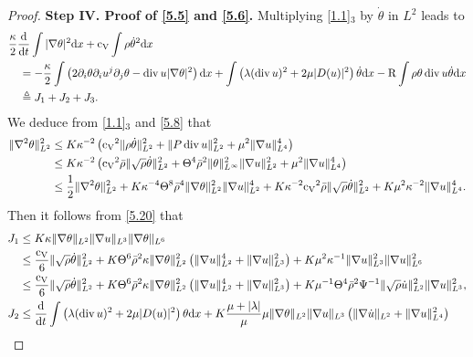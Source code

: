 \documentclass[11pt]{article}
\DeclareMathOperator{\divv}{div}
\newcommand{\na}{\nabla}
\begin{document}
\begin{proof}
{\bf Step IV. Proof of \eqref{5.5} and \eqref{5.6}.}
 Multiplying \eqref{1.1}$_3$ by $\dot\theta$ in $L^2$ leads to
\begin{align}
& \frac{\kappa}{2} \frac{{\rm d}}{{\rm d} t} \int |\nabla\theta|^2 {\rm d} x + {\rm c_V} \int  \rho \dot{\theta}^2 {\rm d} x\notag\\
&\quad = -\frac{\kappa}{2} \int \left( 2 \partial_i \theta \partial_iu^j \partial_j \theta - \divv u |\nabla \theta|^2\right){\rm d} x + \int \left(\lambda (\divv u)^2 + 2 \mu |D(u)|^2 \right) \dot{\theta} {\rm d} x -{\rm R} \int \rho \theta \divv u \dot{\theta} {\rm d} x\notag\\
&\quad \triangleq J_1 + J_2 + J_3.\label{5.19}
\end{align}
We deduce from \eqref{1.1}$_3$ and \eqref{5.8} that
\begin{align}
\|\na^2 \theta\|_{L^2}^2
& \leq K \kappa^{-2}  \left({\rm c_V}^2 \|\rho \dot{\theta}\|_{L^2}^2 + \|P \divv u\|_{L^2}^2 + \mu^2 \|\na u\|_{L^4}^4 \right) \notag\\
& \leq K \kappa^{-2} \left( {\rm c_V}^2 \bar{\rho} \|\sqrt{\rho} \dot{\theta} \|_{L^2}^2 + \Theta^4 \bar{\rho}^2 \|\theta\|_{L^{\infty}}^2 \|\na u\|_{L^2}^2 + \mu^2 \|\na u\|_{L^4}^4 \right) \notag\\
& \leq \frac{1}{2} \|\na^2 \theta\|_{L^2}^2 + K \kappa^{-4} \Theta^8 \bar{\rho}^4 \|\na \theta\|_{L^2}^2 \|\na u\|_{L^2}^4 + K \kappa^{-2} {\rm c_V}^2 \bar{\rho} \|\sqrt{\rho} \dot{\theta}\|_{L^2}^2 + K \mu^2 \kappa^{-2} \|\na u\|_{L^4}^4.\label{5.20}
\end{align}
Then it follows from \eqref{5.20} that
\begin{align*}
J_1
& \leq K \kappa \|\na \theta\|_{L^2} \|\na u\|_{L^3} \|\na \theta\|_{L^6}\\
& \leq \frac{{\rm c_V}}{6} \|\sqrt{\rho} \dot{\theta}\|_{L^2}^2 + K \Theta^6 \bar{\rho}^2 \kappa \|\na \theta\|_{L^2}^2 \left(\|\na u\|_{L^2}^4 + \|\na u\|_{L^3}^2 \right) + K \mu^2 \kappa^{-1} \|\na u\|_{L^3}^2 \|\na u\|_{L^6}^2\\
& \leq \frac{{\rm c_V}}{6} \|\sqrt{\rho} \dot{\theta}\|_{L^2}^2 + K \Theta^6 \bar{\rho}^2 \kappa \|\na \theta\|_{L^2}^2 \left(\|\na u\|_{L^2}^4 + \|\na u\|_{L^3}^2 \right) + K \mu^{-1} \Theta^4 \bar{\rho}^2 \Psi^{-1} \|\sqrt{\rho} \dot{u}\|_{L^2}^2 \|\na u\|_{L^3}^2,\\
J_2
& \leq \frac{{\rm d}}{{\rm d} t} \int \left(\lambda (\divv u)^2 + 2 \mu |D(u)|^2 \right) \theta {\rm d} x + K \frac{\mu + |\lambda|}{\mu} \mu \|\na \theta\|_{L^2} \|\na u\|_{L^3} \left(\|\na \dot{u}\|_{L^2} + \|\na u\|_{L^4}^2 \right)\\

\end{align*}
\end{proof}
\end{document}
